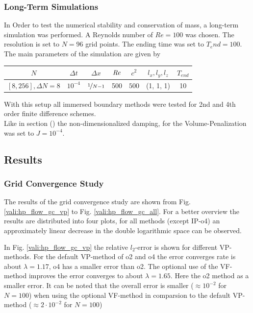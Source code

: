 \subsubsection{Long-Term Simulations}

In Order to test the  numerical stability and conservation of mass, a long-term simulation was performed.
A Reynolds number of $Re=100$ was chosen. The resolution is set to $N=96$ grid points.
The ending time was set to $T_end=100$.
The main parameters of the simulation are  given by

\begin{center}
\vspace*{0.7ex}
\begin{tabular}{c|c|c|c|c|c|c }
 $ N  $                   & $\Delta t$ & $\Delta x$            & $\mbox{\textit{Re}}$  & $c^2$   & $l_x, l_y, l_z$ & $T_{end}$\\
\hline
 $[8, 256], \Delta N = 8 $& $10^{-4}$ & $\nicefrac{1}{N - 1}$ & 500     & $500$   & (1, 1, 1)       & 10\\
\end{tabular}
\vspace*{0.7ex}
\end{center}

With this setup all immersed boundary methods were tested for 2nd and 4th order finite difference schemes.\\
Like in section () the non-dimensionalized damping, for the Volume-Penalization was set to $J=10^{-4}$.

\subsection{Results}

\subsubsection{Grid Convergence Study}

The results of the grid convergence study are shown from Fig. \ref{vali:hp_flow_gc_vp} to Fig. \ref{vali:hp_flow_gc_all}.
For a better overview the results are distributed into four plots,
for all methods (except IP-o4) an approximately linear decrease in the double logarithmic space can be observed.

In Fig. \ref{vali:hp_flow_gc_vp} the relative $l_2$-error is shown for different VP-methods.
For the default VP-method of o2 and o4 the error converges rate is about $\lambda=1.17$,
o4 has a smaller error than o2.
The optional use of the VF-method improves the error converges to about $\lambda=1.65$.
Here the o2 method as a smaller error.
It can be noted that the overall error is smaller ($\approx 10^{-2}$ for $N=100$)
when using the optional VF-method in comparsion to the default VP-method ($\approx2\cdot 10^{-2}$ for $N=100$)

